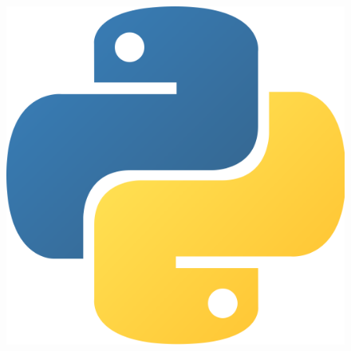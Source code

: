 \documentclass[10pt]{beamer}
\begin{document}
\begin{frame}
\begin{columns}
\hspace{3mm}
\hspace{3mm}
\begin{column}{.33\textwidth}
\hspace{5mm}
\hspace{5mm}
\vspace{-3mm}
 \begin{figure}
  \includegraphics[scale=0.1]{./Figures/python.png} 
 \end{figure}  
\end{column}%

\end{columns}

\end{frame}
\end{document}
